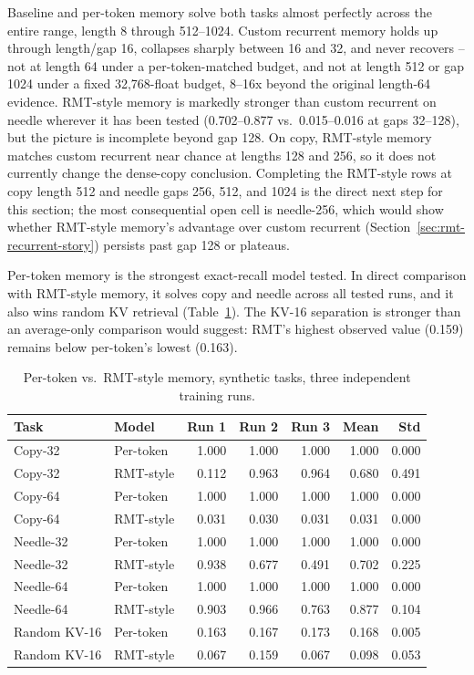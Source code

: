 \documentclass[10pt]{article} %
\begin{document}
Baseline and per-token memory solve both tasks almost perfectly across
the entire range, length 8 through 512--1024. Custom recurrent memory
holds up through length/gap 16, collapses sharply between 16 and 32, and
never recovers -- not at length 64 under a per-token-matched budget, and
not at length 512 or gap 1024 under a fixed 32,768-float budget, 8--16x
beyond the original length-64 evidence. RMT-style memory is markedly
stronger than custom recurrent on needle wherever it has been tested
(0.702--0.877 vs.\ 0.015--0.016 at gaps 32--128), but the picture is
incomplete beyond gap 128. On copy, RMT-style memory matches custom
recurrent near chance at lengths 128 and 256, so it does not currently
change the dense-copy conclusion. Completing the RMT-style rows at copy
length 512 and needle gaps 256, 512, and 1024 is the direct next step for
this section; the most consequential open cell is needle-256, which would
show whether RMT-style memory's advantage over custom recurrent
(Section~\ref{sec:rmt-recurrent-story}) persists past gap 128 or
plateaus.



Per-token memory is the strongest exact-recall model tested. In direct
comparison with RMT-style memory, it solves copy and needle across all
tested runs, and it also wins random KV retrieval
(Table~\ref{tab:pertoken_vs_rmt}). The KV-16 separation is stronger than an
average-only comparison would suggest: RMT's highest observed value
(0.159) remains below per-token's lowest (0.163).

\begin{table}[h]
\centering
\caption{Per-token vs.\ RMT-style memory, synthetic tasks, three independent training runs.}
\label{tab:pertoken_vs_rmt}
\begin{tabular}{llrrrrr}
\toprule
Task & Model & Run 1 & Run 2 & Run 3 & Mean & Std \\
\midrule
Copy-32       & Per-token & 1.000 & 1.000 & 1.000 & 1.000 & 0.000 \\
Copy-32       & RMT-style & 0.112 & 0.963 & 0.964 & 0.680 & 0.491 \\
Copy-64       & Per-token & 1.000 & 1.000 & 1.000 & 1.000 & 0.000 \\
Copy-64       & RMT-style & 0.031 & 0.030 & 0.031 & 0.031 & 0.000 \\
Needle-32     & Per-token & 1.000 & 1.000 & 1.000 & 1.000 & 0.000 \\
Needle-32     & RMT-style & 0.938 & 0.677 & 0.491 & 0.702 & 0.225 \\
Needle-64     & Per-token & 1.000 & 1.000 & 1.000 & 1.000 & 0.000 \\
Needle-64     & RMT-style & 0.903 & 0.966 & 0.763 & 0.877 & 0.104 \\
Random KV-16  & Per-token & 0.163 & 0.167 & 0.173 & 0.168 & 0.005 \\
Random KV-16  & RMT-style & 0.067 & 0.159 & 0.067 & 0.098 & 0.053 \\
\bottomrule
\end{tabular}
\end{table}
\end{document}
